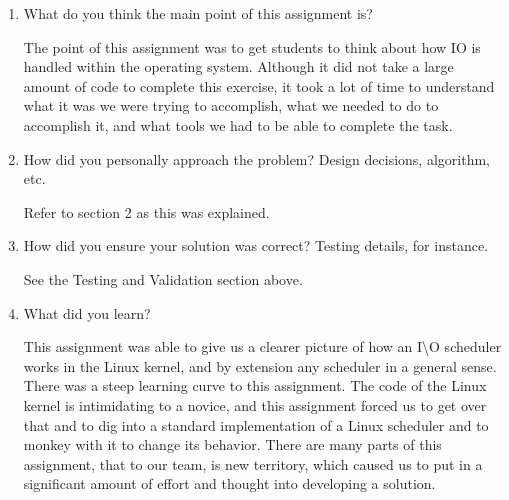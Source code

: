 \documentclass[letterpaper,10pt,draftclsnofoot,onecolumn]{IEEEtran}
\begin{document}
\begin{enumerate}
\item What do you think the main point of this assignment is?

The point of this assignment was to get students to think about how IO is handled within the operating system. Although it did not take a large amount of code to complete this exercise, it took a lot of time to understand what it was we were trying to accomplish, what we needed to do to accomplish it, and what tools we had to be able to complete the task. 
\item How did you personally approach the problem? Design decisions, algorithm, etc.

Refer to section 2 as this was explained.

\item How did you ensure your solution was correct? Testing details, for instance.

See the Testing and Validation section above. 

\item What did you learn?

This assignment was able to give us a clearer picture of how an I\textbackslash O scheduler works in the Linux kernel, and by extension any scheduler in a general sense. There was a steep learning curve to this assignment. The code of the Linux kernel is intimidating to a novice, and this assignment forced us to get over that and to dig into a standard implementation of a Linux scheduler and to monkey with it to change its behavior. There are many parts of this assignment, that to our team, is new territory, which caused us to put in a significant amount of effort and thought into developing a solution. 
\end{enumerate}
\end{document}
